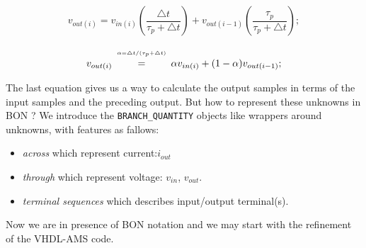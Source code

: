\documentclass{article}
\def\lstinlinen{\lstinline[language=Bon,basicstyle=\normalsize\upshape]}
\begin{document}
\begin{equation}
v_{out(i)}=v_{in(i)}(\frac{\triangle t}{\tau_p + \triangle t}) +
 v_{out(i-1)}(\frac{\tau_p}{\tau_p + \triangle t});                                                                                                                  
\end{equation}

\begin{equation}
v_{out(i)} 
 \begin{array}[b]{c}                                                                                                                                    
      {\scriptscriptstyle \alpha= \triangle t / (\tau_p + \triangle t)}  \\=                                                                                                           
 \end{array}
 \alpha v_{in(i)} + (1- \alpha) v_{out(i-1)};                                                                                                                  
\end{equation}

The last equation gives us a way to calculate the output samples in terms of the 
input samples and the preceding output.
But how to represent these unknowns in BON ?
We introduce the  \lstinlinen|BRANCH_QUANTITY| objects like wrappers around unknowns,
with features as fallows:
\begin{itemize}
\item
\emph{across} which represent current:$i_{out}$ 
\item 
\emph{through} which represent voltage: $v_{in}$, $v_{out}$. 
\item 
\emph{terminal sequences} which describes input/output terminal(s). 
\end{itemize}
Now we are in presence of BON notation and we may start
with the  refinement of the VHDL-AMS code.\\
\end{document}
